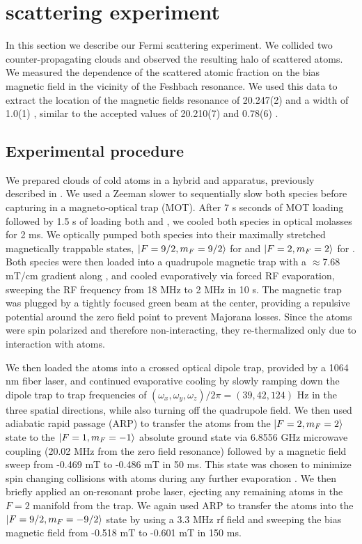 \documentclass[12pt]{iopart}
\begin{document}
\section{\swave{} scattering experiment}
In this section we describe our Fermi scattering experiment. We collided two counter-propagating \K{} clouds and observed the resulting \swave{} halo of scattered atoms.  We measured the dependence of the scattered atomic fraction on the bias magnetic field in the vicinity of the Feshbach resonance. We used this data to extract the location of the magnetic fields resonance of 20.247(2) \mT{} and a width of 1.0(1) \mT{}, similar to the accepted values of 20.210(7) \mT{} and 0.78(6) \mT{} \cite{Regal04}.
\subsection{Experimental procedure}
We prepared clouds of cold \K{} atoms in a hybrid \K{} and \Rb{} apparatus, previously described in \cite{Williams13, Lin09, KarinaThesis}. We used a Zeeman slower to sequentially slow both species before capturing in a magneto-optical trap (MOT). After 7 s seconds of MOT loading \K{} followed by 1.5 s of loading both \K{} and \Rb{}, we cooled both species in optical molasses for 2 ms. We optically pumped both species into their maximally stretched magnetically trappable states, $\mathinner{|{F=9/2, m_F=9/2}\rangle}$ for \K{} and $\mathinner{|{F=2,m_F=2}\rangle}$ for \Rb{}. Both species were then loaded into a quadrupole magnetic trap with a $\approx$7.68 mT/cm gradient along \ez{}, and cooled evaporatively via forced RF evaporation, sweeping the RF frequency from 18 MHz to 2 MHz in 10 s. The magnetic trap was plugged by a tightly focused green beam at the center, providing a repulsive potential around the zero field point to prevent Majorana losses. Since the \K{} atoms were spin polarized and therefore non-interacting, they re-thermalized only due to interaction with \Rb{} atoms. 
\par We then loaded the atoms into a crossed optical dipole trap, provided by a 1064 nm fiber laser, and continued evaporative cooling by slowly ramping down the dipole trap to trap frequencies of $(\omega_x,\omega_y,\omega_z)/2\pi =(39, 42, 124)$ Hz in the three spatial directions, while also turning off the quadrupole field. We then used adiabatic rapid passage (ARP) to transfer the \Rb{} atoms from the $\mathinner{|{F=2, m_F=2}\rangle}$ state to the  $\mathinner{|{F=1, m_F=-1}\rangle}$ absolute ground state via 6.8556 GHz microwave coupling (20.02 MHz from the zero field resonance) followed by a magnetic field sweep from -0.469 mT to -0.486 mT in 50 ms. This state was chosen to minimize spin changing collisions with \K{} atoms during any further evaporation \cite{BestThesis}.  We then briefly applied an on-resonant probe laser, ejecting any remaining \Rb{} atoms in the $F=2$ manifold from the trap. We again used ARP to transfer the \K{} atoms into the $\mathinner{|{F=9/2,m_F=-9/2}\rangle}$ state by using a 3.3 MHz rf field and sweeping the bias magnetic field from -0.518 mT to -0.601 mT in 150 ms. 
\end{document}
